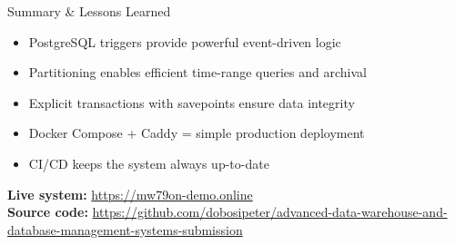 \documentclass[aspectratio=169]{beamer}
\begin{document}
\begin{frame}{Summary \& Lessons Learned}
\begin{itemize}
  \item PostgreSQL triggers provide powerful event-driven logic
  \item Partitioning enables efficient time-range queries and archival
  \item Explicit transactions with savepoints ensure data integrity
  \item Docker Compose + Caddy = simple production deployment
  \item CI/CD keeps the system always up-to-date
\end{itemize}
\vspace{1em}
\textbf{Live system:} \url{https://mw79on-demo.online}\\
\textbf{Source code:} \url{https://github.com/dobosipeter/advanced-data-warehouse-and-database-management-systems-submission}
\end{frame}
\end{document}
